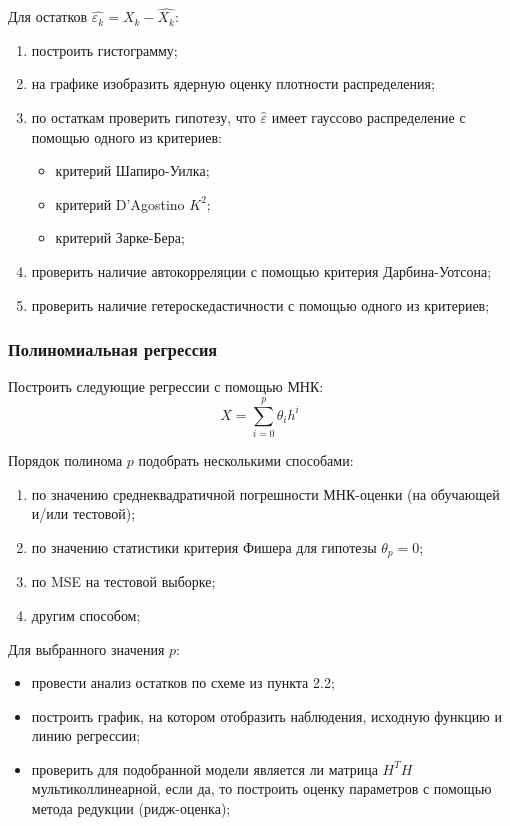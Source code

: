 \documentclass[a4paper,12pt]{article}
\begin{document}
Для остатков $\hat{\varepsilon_k} = X_k - \hat{X_k}$:
\begin{enumerate}
    \item построить гистограмму;
    \item на графике изобразить ядерную оценку плотности распределения;
    \item по остаткам проверить гипотезу, что $\hat{\varepsilon}$ имеет гауссово распределение с помощью одного из критериев:
    \begin{itemize}
        \item критерий Шапиро-Уилка;
        \item критерий D'Agostino $K^2$;
        \item критерий Зарке-Бера;
    \end{itemize}
    \item проверить наличие автокорреляции с помощью критерия Дарбина-Уотсона;
    \item проверить наличие гетероскедастичности с помощью одного из критериев;
\end{enumerate}



\subsubsection{Полиномиальная регрессия}

Построить следующие регрессии с помощью МНК:
$$ X = \sum\limits_{i=0}^p \theta_i h^i $$

Порядок полинома $p$ подобрать несколькими способами:
\begin{enumerate}
    \item по значению среднеквадратичной погрешности МНК-оценки (на обучающей и/или тестовой);
    \item по значению статистики критерия Фишера для гипотезы $\theta_p = 0$;
    \item по MSE на тестовой выборке;
    \item другим способом;
\end{enumerate}

Для выбранного значения $p$:
\begin{itemize}
    \item провести анализ остатков по схеме из пункта 2.2;
    \item построить график, на котором отобразить наблюдения, исходную функцию и линию регрессии;
    \item проверить для подобранной модели является ли матрица $H^T H$ мультиколлинеарной, если да, то построить оценку параметров с помощью метода редукции (ридж-оценка);
\end{itemize}
\end{document}
